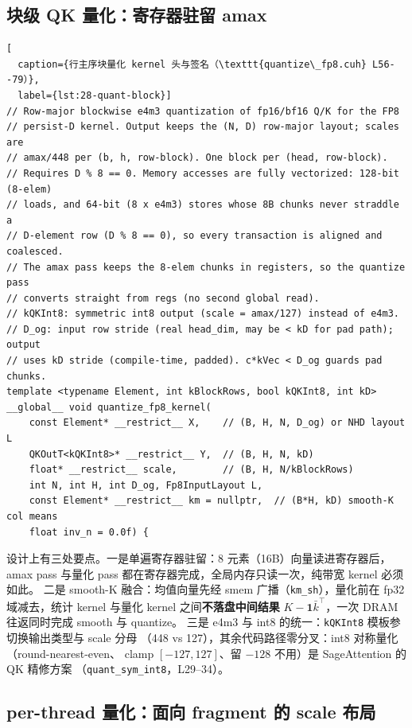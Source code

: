 \subsection{块级 QK 量化：寄存器驻留 amax}\label{sec:28-quant-block}

\begin{lstlisting}[
  caption={行主序块量化 kernel 头与签名（\texttt{quantize\_fp8.cuh} L56--79）},
  label={lst:28-quant-block}]
// Row-major blockwise e4m3 quantization of fp16/bf16 Q/K for the FP8
// persist-D kernel. Output keeps the (N, D) row-major layout; scales are
// amax/448 per (b, h, row-block). One block per (head, row-block).
// Requires D % 8 == 0. Memory accesses are fully vectorized: 128-bit (8-elem)
// loads, and 64-bit (8 x e4m3) stores whose 8B chunks never straddle a
// D-element row (D % 8 == 0), so every transaction is aligned and coalesced.
// The amax pass keeps the 8-elem chunks in registers, so the quantize pass
// converts straight from regs (no second global read).
// kQKInt8: symmetric int8 output (scale = amax/127) instead of e4m3.
// D_og: input row stride (real head_dim, may be < kD for pad path); output
// uses kD stride (compile-time, padded). c*kVec < D_og guards pad chunks.
template <typename Element, int kBlockRows, bool kQKInt8, int kD>
__global__ void quantize_fp8_kernel(
    const Element* __restrict__ X,    // (B, H, N, D_og) or NHD layout L
    QKOutT<kQKInt8>* __restrict__ Y,  // (B, H, N, kD)
    float* __restrict__ scale,        // (B, H, N/kBlockRows)
    int N, int H, int D_og, Fp8InputLayout L,
    const Element* __restrict__ km = nullptr,  // (B*H, kD) smooth-K col means
    float inv_n = 0.0f) {
\end{lstlisting}

设计上有三处要点。一是单遍寄存器驻留：8 元素（16B）向量读进寄存器后，
amax pass 与量化 pass 都在寄存器完成，全局内存只读一次，纯带宽 kernel 必须如此。
二是 smooth-K 融合：均值向量先经 smem 广播（\texttt{km\_sh}），量化前在 fp32
域减去，统计 kernel 与量化 kernel 之间\textbf{不落盘中间结果}
$K - \mathbf{1}\bar k^{\top}$，一次 DRAM 往返同时完成 smooth 与 quantize。
三是 e4m3 与 int8 的统一：\texttt{kQKInt8} 模板参切换输出类型与 scale 分母
（448 vs 127），其余代码路径零分叉：int8 对称量化（round-nearest-even、
clamp $[-127,127]$、留 $-128$ 不用）是 SageAttention 的 QK 精修方案
（\texttt{quant\_sym\_int8}，L29--34）。

\subsection{per-thread 量化：面向 fragment 的 scale 布局}\label{sec:28-quant-perthread}

